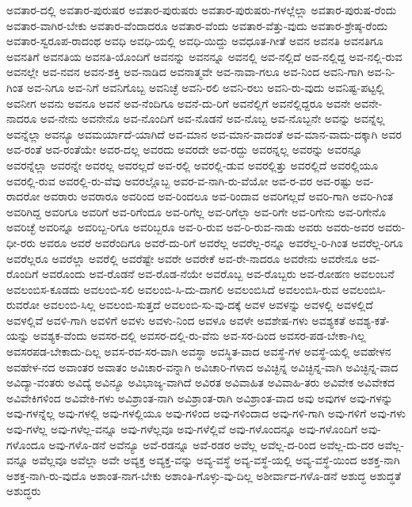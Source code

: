{ಅವತಾರ-ದಲ್ಲಿ
ಅವತಾರ-ಪುರುಷರ
ಅವತಾರ-ಪುರುಷರು
ಅವತಾರ-ಪುರುಷರು-ಗಳಲ್ಲೆಲ್ಲಾ
ಅವತಾರ-ಪುರುಷ-ರೆಂದು
ಅವತಾರ-ವಾಗಿರ-ಬೇಕು
ಅವತಾರ-ವೆಂದಾದರೂ
ಅವತಾರ-ವೆಂದು
ಅವತಾರ-ವೆತ್ತು-ವುದು
ಅವತಾರ-ಶ್ರೇಷ್ಠ-ರೆಂದು
ಅವತಾರ-ಸ್ವರೂಪ-ರಾದಂಥ
ಅವಧಿ
ಅವಧಿ-ಯಲ್ಲಿ
ಅವಧಿ-ಯಿದ್ದು
ಅವಧೂತ-ಗೀತೆ
ಅವನ
ಅವನತಿ
ಅವನತಿಗೂ
ಅವನತಿಗೆ
ಅವನತಿಯ
ಅವನತಿ-ಯೊಂದಿಗೆ
ಅವನನ್ನು
ಅವನನ್ನೂ
ಅವನಲ್ಲಿ
ಅವ-ನಲ್ಲಿದೆ
ಅವ-ನಲ್ಲಿದ್ದ
ಅವ-ನಲ್ಲಿ-ರುವ
ಅವನಲ್ಲೇ
ಅವ-ನವನ
ಅವನ-ಶಕ್ತಿ
ಅವ-ನಾಡಿದ
ಅವನಾತ್ಮವೇ
ಅವ-ನಾವಾ-ಗಲೂ
ಅವ-ನಿಂದ
ಅವನಿ-ಗಾಗಿ
ಅವ-ನಿ-ಗಿಂತ
ಅವ-ನಿಗೂ
ಅವ-ನಿಗೆ
ಅವನಿಗೊಬ್ಬ
ಅವನಿಚ್ಛೆ
ಅವನಿ-ರಲಿ
ಅವನಿ-ರಲು
ಅವನಿ-ರು-ವುದು
ಅವನಿಷ್ಟ-ಪಟ್ಟಲ್ಲಿ
ಅವನೀಗ
ಅವನು
ಅವನೂ
ಅವನೆ
ಅವ-ನೆಂದಿಗೂ
ಅವನೆ-ದು-ರಿಗೆ
ಅವನೆಲ್ಲಿಗೆ
ಅವನೆಲ್ಲಿದ್ದರೂ
ಅವನೇ
ಅವನೇ-ನಾದರೂ
ಅವ-ನೇನು
ಅವನೇನೊ
ಅವ-ನೊಂದಿಗೆ
ಅವ-ನೊಡನೆ
ಅವ-ನೊಬ್ಬ
ಅವ-ನೊಬ್ಬನೇ
ಅವನ್ನು
ಅವನ್ನೆಲ್ಲ
ಅವನ್ನೆಲ್ಲಾ
ಅವನ್ಯೂ
ಅವಮರ್ಯಾದೆ-ಯಾಗಿದೆ
ಅವ-ಮಾನ
ಅವ-ಮಾನ-ವಾದಂತೆ
ಅವ-ಮಾನ-ವಾದು-ದಕ್ಕಾಗಿ
ಅವರ
ಅವ-ರಂತೆ
ಅವ-ರಂತೆಯೇ
ಅವರ-ದಲ್ಲ
ಅವರದು
ಅವರದೇ
ಅವ-ರದ್ದು
ಅವರನ್ನಲ್ಲ
ಅವರನ್ನು
ಅವರನ್ನೂ
ಅವರನ್ನೆಲ್ಲಾ
ಅವರನ್ನೇ
ಅವರಲ್ಲ
ಅವರಲ್ಲದೆ
ಅವ-ರಲ್ಲಿ
ಅವರಲ್ಲಿ-ಡುವ
ಅವರಲ್ಲಿತ್ತು
ಅವರಲ್ಲಿದೆ
ಅವರಲ್ಲಿಯೂ
ಅವರಲ್ಲಿ-ರುವ
ಅವರಲ್ಲಿ-ರು-ವೆವು
ಅವರಲ್ಲೊಬ್ಬ
ಅವರ-ವ-ನಾಗಿ-ರು-ವೆಯೋ
ಅವ-ರ-ವರ
ಅವ-ರಷ್ಟು
ಅವ-ರಾದರೋ
ಅವರಾರು
ಅವರಾರೂ
ಅವರಿಂದ
ಅವ-ರಿಂದಲೂ
ಅವ-ರಿಂದಾವ
ಅವರಿಗಲ್ಲದೆ
ಅವರಿ-ಗಾಗಿ
ಅವರಿ-ಗಿಂತ
ಅವರಿಗಿದ್ದ
ಅವರಿಗೂ
ಅವರಿಗೆ
ಅವ-ರಿಗೆಂದೂ
ಅವ-ರಿಗೆಲ್ಲ
ಅವ-ರಿಗೆಲ್ಲಾ
ಅವ-ರಿಗೇ
ಅವ-ರಿಗೇನು
ಅವ-ರಿಗೇನೊ
ಅವರಿಚ್ಛೆ
ಅವರಿನ್ನೂ
ಅವರಿಬ್ಬ-ರಿಗೂ
ಅವರಿಬ್ಬರೂ
ಅವ-ರಿ-ರುವ
ಅವ-ರಿ-ರುವ-ನಾಡು
ಅವರು
ಅವರು-ಅವರ
ಅವರು-ಧೀ-ರರು
ಅವರೂ
ಅವರೆ
ಅವರೆಂದಿಗೂ
ಅವರೆ-ದು-ರಿಗೆ
ಅವರೆಲ್ಲ
ಅವರೆಲ್ಲ-ರನ್ನೂ
ಅವರೆಲ್ಲ-ರಿ-ಗಿಂತ
ಅವರೆಲ್ಲ-ರಿಗೂ
ಅವರೆಲ್ಲರೂ
ಅವರೆಲ್ಲಾ
ಅವರೆಲ್ಲಿ
ಅವರೆಷ್ಟೇ
ಅವರೇ
ಅವರೇಕೆ
ಅವ-ರೇ-ನಾದರೂ
ಅವರೇನು
ಅವರೇನೂ
ಅವ-ರೊಂದಿಗೆ
ಅವರೊಂದು
ಅವ-ರೊಡನೆ
ಅವ-ರೊಡ-ನೆಯೇ
ಅವರೊಬ್ಬ
ಅವ-ರೊಬ್ಬರು
ಅವ-ರೋಹಣ
ಅವಲಂಬನೆ
ಅವಲಂಬಿಸ-ಕೂಡದು
ಅವಲಂಬಿ-ಸಲಿ
ಅವಲಂಬಿ-ಸಿ-ದು-ದಾಗಲಿ
ಅವಲಂಬಿಸಿದೆ
ಅವಲಂಬಿಸಿ-ರುವ
ಅವಲಂಬಿಸಿ-ರುವರೋ
ಅವಲಂಬಿ-ಸಿಲ್ಲ
ಅವಲಂಬಿ-ಸುತ್ತದೆ
ಅವಲಂಬಿ-ಸು-ವು-ದಕ್ಕೆ
ಅವಳ
ಅವಳನ್ನು
ಅವಳಲ್ಲಿ
ಅವಳಲ್ಲಿದೆ
ಅವಳಲ್ಲಿವೆ
ಅವಳಿ-ಗಾಗಿ
ಅವಳಿಗೆ
ಅವಳು
ಅವಳು-ನಿಂದ
ಅವಳೂ
ಅವಳೇ
ಅವಶೇಷ-ಗಳು
ಅವಶ್ಯಕತೆ
ಅವಶ್ಯ-ಕತೆ-ಯನ್ನು
ಅವಶ್ಯಕ-ವೆಂದು
ಅವಸರ-ದಲ್ಲಿ
ಅವಸರ-ದಲ್ಲಿ-ರು-ವೆನು
ಅವ-ಸರ-ದಿಂದ
ಅವಸರ-ಪಡ-ಬೇಕಾ-ಗಿಲ್ಲ
ಅವಸರಪಡ-ಬೇಕಾದು-ದಿಲ್ಲ
ಅವಸ-ರವ-ಸರ-ವಾಗಿ
ಅವಸ್ಥಾ
ಅವಸ್ಥಿತ-ವಾದ
ಅವಸ್ಥೆ-ಗಳ
ಅವಸ್ಥೆ-ಯಲ್ಲಿ
ಅವಹೇಳನ
ಅವಹೇಳ-ನದ
ಅವಾಂತರ
ಅವಾತಂ
ಅವಿಚಾರ-ವನ್ನಾಗಿ
ಅವಿಚಾರಿ-ಗಳಾದ
ಅವಿಚ್ಛಿನ್ನ
ಅವಿಚ್ಛಿನ್ನ-ವಾಗಿ
ಅವಿಚ್ಛಿನ್ನ-ವಾದ
ಅವಿದ್ಯಾ-ವಂತರು
ಅವಿದ್ಯೆ
ಅವಿನ್ಯೂ
ಅವಿಭಾಜ್ಯ-ವಾಗಿದೆ
ಅವಿರತ
ಅವಿವಾಹಿತ
ಅವಿವಾಹಿ-ತರು
ಅವಿವೇಕ
ಅವಿವೇಕದ
ಅವಿವೇಕಿಗಳಿಂದ
ಅವಿವೇಕಿ-ಗಳು
ಅವಿಶ್ರಾಂತ-ನಾಗಿ
ಅವಿಶ್ರಾಂತ-ರಾಗಿ
ಅವಿಶ್ರಾಂತ-ವಾದ
ಅವು
ಅವುಗಳ
ಅವು-ಗಳನ್ನು
ಅವು-ಗಳನ್ನೆಲ್ಲ
ಅವು-ಗಳಲ್ಲಿ
ಅವು-ಗಳಲ್ಲಿಯೂ
ಅವು-ಗಳಿಂದ
ಅವು-ಗಳಿಂದಾದ
ಅವು-ಗಳಿ-ಗಾಗಿ
ಅವು-ಗಳಿಗೆ
ಅವು-ಗಳು
ಅವು-ಗಳೆಲ್ಲ
ಅವು-ಗಳೆಲ್ಲ-ವನ್ನೂ
ಅವು-ಗಳೆಲ್ಲವೂ
ಅವು-ಗಳೆಲ್ಲಿವೆ
ಅವು-ಗಳೊಂದನ್ನೂ
ಅವು-ಗಳೊಂದಿಗೆ
ಅವು-ಗಳೊಂದೂ
ಅವು-ಗಳೊ-ಡನೆ
ಅವೆನ್ಯೂ
ಅವೆ-ರಡನ್ನೂ
ಅವೆ-ರಡರ
ಅವೆಲ್ಲ
ಅವೆಲ್ಲ-ದ-ರಿಂದ
ಅವೆಲ್ಲ-ದು-ದರ
ಅವೆಲ್ಲ-ವನ್ನೂ
ಅವೆಲ್ಲವೂ
ಅವೆಲ್ಲಾ
ಅವೇ
ಅವ್ಯಕ್ತ
ಅವ್ಯಕ್ತ-ವನ್ನು
ಅವ್ಯ-ವಸ್ಥೆ
ಅವ್ಯ-ವಸ್ಥೆ-ಯಲ್ಲಿ
ಅವ್ಯ-ವಸ್ಥೆ-ಯಿಂದ
ಅಶಕ್ತ-ನಾಗಿ
ಅಶಕ್ತ-ನಾಗಿ-ರು-ವುದೊ
ಅಶಾಂತ-ನಾಗ-ಬೇಕು
ಅಶಾಂತಿ-ಗೊಳ್ಳು-ವು-ದಿಲ್ಲ
ಅಶೀರ್ವಾದ-ಗಳೊ-ಡನೆ
ಅಶುದ್ಧ
ಅಶುದ್ಧತೆ
ಅಶುದ್ಧರು
}
